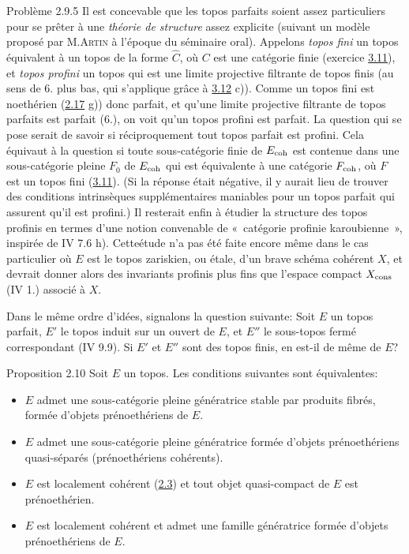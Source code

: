 \documentclass[10pt]{../fichiers-configuration-latex/smfart}
\begin{document}
\begin{enonce*}[remark]{Problème 2.9.5}
Il est concevable que les topos parfaits soient assez particuliers
pour se prêter à une \emph{théorie de structure} assez explicite
(suivant un modèle proposé par M.\textsc{Artin} à l'époque du
séminaire oral). Appelons \emph{topos fini} un topos équivalent à un
topos de la forme $\widehat{C}$, où $C$  est une catégorie finie
(\cf exercice \hyperref[VI.exer3.11]{3.11}), et \emph{topos profini} un topos
qui est une limite projective filtrante de topos finis (au sens de
6. plus bas, qui s'applique grâce à \hyperref[VI.exer3.12]{3.12} c)). Comme un
topos fini est noethérien (\hyperref[VI.exer2.17]{2.17} g)) donc parfait, et
qu'une limite projective filtrante de topos parfaits est parfait
(6.), on voit qu'un topos profini est parfait. La question qui se
pose serait de savoir si réciproquement tout topos parfait est
profini. Cela équivaut à la question si toute sous-catégorie finie
de $E_{\mathrm{coh}}$ est contenue dans une sous-catégorie pleine $F_{0}$ de
$E_{\mathrm{coh}}$ qui est équivalente à une catégorie $F_{\mathrm{coh}}$, où
$F$ est un topos fini (\cf \hyperref[VI.exer3.11]{3.11}). (Si la réponse était
négative, il y aurait lieu de trouver des conditions intrinsèques
supplémentaires maniables pour un topos parfait qui assurent qu'il
est profini.) Il resterait enfin à étudier la structure des topos
profinis en termes d'une notion convenable de « catégorie profinie
karoubienne », inspirée de IV 7.6 h). Cette\pageoriginale étude
n'a pas été faite encore même dans le cas particulier
où $E$ est
le topos zariskien, ou étale, d'un brave schéma cohérent $X$, et
devrait donner alors des invariants profinis plus fins que l'espace compact
$X_{\operatorname{cons}}$ (\EGA IV 1.) associé à $X$.

Dans le même ordre d'idées, signalons la question suivante: Soit
$E$ un topos parfait, $E'$ le topos induit sur un ouvert de $E$, et
$E''$ le sous-topos fermé correspondant (IV 9.9). Si $E'$ et $E''$
sont des topos finis, en est-il de même de $E$?
\end{enonce*}

\begin{enonce*}{Proposition 2.10}
Soit $E$ un topos. Les conditions suivantes sont équivalentes:
\begin{itemize}
\item[(i)] $E$ admet une sous-catégorie pleine génératrice
  stable par
  produits fibrés, formée d'objets prénoethériens de $E$.

\item[(ii)] $E$ admet une sous-catégorie pleine
  génératrice formée d'objets
  prénoethériens quasi-séparés (\ie prénoethériens cohérents).

\item[(iii)] $E$ est localement cohérent (\hyperref[VI.def2.3]{2.3}) et tout objet quasi-compact de
  $E$ est prénoethérien.

\item[(iii bis)] $E$ est localement cohérent et admet une famille
  génératrice formée d'objets prénoethériens de $E$.
\end{itemize}
\end{enonce*}
\end{document}
